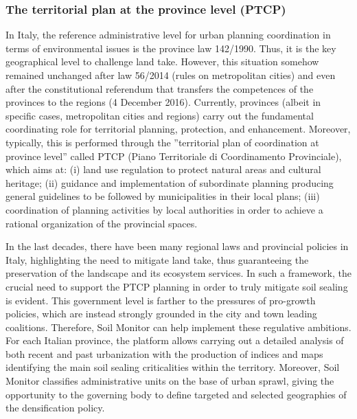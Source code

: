 \documentclass[APA,LATO1COL,doublespace]{WileyNJD-v2}
\newcommand{\toberevised}[1]{\emph{\textcolor{red}{#1}}} %
\begin{document}
\subsubsection{The territorial plan at the province level (PTCP)} %
\label{sec:casePROV}
In Italy, the reference administrative level for urban planning coordination in terms of environmental issues is the province law 142/1990. 
Thus, it is the key geographical level to challenge land take. 
However, this situation somehow remained unchanged after law 56/2014 (rules on metropolitan cities) and even after the constitutional referendum that transfers the competences of the provinces to the regions (4 December 2016).
Currently, provinces (albeit in specific cases, metropolitan cities and regions) carry out the fundamental coordinating role for territorial planning, protection, and enhancement. 
Moreover, typically, this is performed through the ''territorial plan of coordination at province level'' called PTCP (Piano Territoriale di Coordinamento Provinciale), which aims at: (i) land use regulation to protect natural areas and cultural heritage; (ii) guidance and implementation of subordinate planning producing general guidelines to be followed by municipalities in their local plans; (iii) coordination of planning activities by local authorities in order to achieve a rational organization of the provincial spaces.

In the last decades, there have been many regional laws and provincial policies in Italy, highlighting the need to mitigate land take, thus guaranteeing the preservation of the landscape and its ecosystem services. 
In such a framework, the crucial need to support the PTCP planning in order to truly mitigate soil sealing is evident. 
This government level is farther to the pressures of pro-growth policies, which are instead strongly grounded in the city and town leading coalitions.
Therefore, Soil Monitor can help implement these regulative ambitions.
For each Italian province, the platform allows carrying out a detailed analysis of both recent and past urbanization with the production of indices and maps identifying the main soil sealing criticalities within the territory.
Moreover, Soil Monitor classifies administrative units on the base of urban sprawl, giving the opportunity to the governing body to define targeted and selected geographies of the densification policy.
\end{document}
